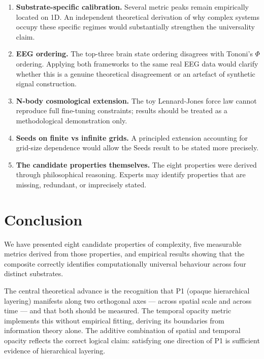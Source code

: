 \documentclass[12pt,a4paper]{article}
\begin{document}
\begin{enumerate}[noitemsep]
  \item \textbf{Substrate-specific calibration.}
    Several metric peaks remain empirically located on 1D.
    An independent theoretical derivation of why complex systems
    occupy these specific regimes would substantially strengthen the
    universality claim.

  \item \textbf{EEG ordering.}
    The top-three brain state ordering disagrees with Tononi's $\Phi$
    ordering.
    Applying both frameworks to the same real EEG data would clarify
    whether this is a genuine theoretical disagreement or an artefact
    of synthetic signal construction.

  \item \textbf{N-body cosmological extension.}
    The toy Lennard-Jones force law cannot reproduce full fine-tuning
    constraints; results should be treated as a methodological
    demonstration only.

  \item \textbf{Seeds on finite vs infinite grids.}
    A principled extension accounting for grid-size dependence would
    allow the Seeds result to be stated more precisely.

  \item \textbf{The candidate properties themselves.}
    The eight properties were derived through philosophical reasoning.
    Experts may identify properties that are missing, redundant, or
    imprecisely stated.
\end{enumerate}

\section{Conclusion}

We have presented eight candidate properties of complexity, five
measurable metrics derived from those properties, and empirical
results showing that the composite correctly identifies
computationally universal behaviour across four distinct substrates.

The central theoretical advance is the recognition that P1 (opaque
hierarchical layering) manifests along two orthogonal axes --- across
spatial scale and across time --- and that both should be measured.
The temporal opacity metric implements this without empirical fitting,
deriving its boundaries from information theory alone.
The additive combination of spatial and temporal opacity reflects the
correct logical claim: satisfying one direction of P1 is sufficient
evidence of hierarchical layering.
\end{document}
